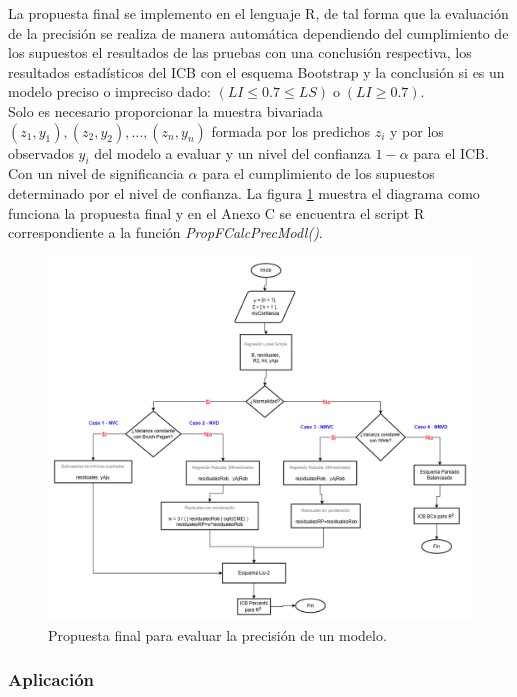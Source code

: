 La propuesta final se implemento en el lenguaje R, de tal forma que la evaluación de la precisión se realiza de manera automática dependiendo del
cumplimiento de los supuestos el resultados de las pruebas con una conclusión respectiva, los resultados estadísticos del ICB con el esquema Bootstrap y la conclusión si es un modelo preciso o impreciso dado: $\left( LI \leq 0.7 \leq LS \right) \; \text{o} \; \left( LI \geq 0.7 \right)$.\\

Solo es necesario proporcionar la muestra bivariada $(z_1, y_1), (z_2, y_2), \dots, (z_n, y_n)$ formada por los predichos $z_i$ y por los observados $y_i$ del modelo a evaluar y un nivel del confianza $1-\alpha$ para el ICB. Con un nivel de significancia $\alpha$ para el cumplimiento de los supuestos determinado por el nivel de confianza. La figura \ref{fig:propuestaFinal}  muestra el diagrama como funciona la propuesta final y en el Anexo C se encuentra el script R correspondiente a la función \textit{PropFCalcPrecModl()}.

\begin{figure}[ht!]
	\centering 
	\includegraphics[width=0.9\linewidth]{img/propuestaFinalv7.png} 
	\caption{Propuesta final para evaluar la precisión de un modelo.}
	\label{fig:propuestaFinal}
\end{figure}
\FloatBarrier

\subsubsection{Aplicación}



